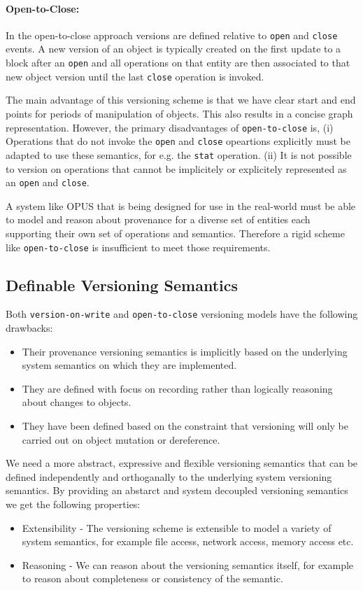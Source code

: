 \documentclass[withindex,glossary]{cam-thesis}
\begin{document}
\paragraph{Open-to-Close:}
In the open-to-close approach versions are defined relative to \texttt{open} and \texttt{close} events.
A new version of an object is typically created on the first update to a block after an \texttt{open} and all operations on that entity are then associated to that new object version until the last \texttt{close} operation is invoked.

The main advantage of this versioning scheme is that we have clear start and end points for periods of manipulation of objects.
This also results in a concise graph representation.
However, the primary disadvantages of \texttt{open-to-close} is,
(i) Operations that do not invoke the \texttt{open} and \texttt{close} opeartions explicitly must be adapted to use these semantics, for e.g. the \texttt{stat} operation.
(ii) It is not possible to version on operations that cannot be implicitely or explicitely represented as an \texttt{open} and \texttt{close}.

A system like OPUS that is being designed for use in the real-world must be able to model and reason about provenance for a diverse set of entities each supporting their own set of operations and semantics. Therefore a rigid scheme like \texttt{open-to-close} is insufficient to meet those requirements.

\subsection{Definable Versioning Semantics}
Both \texttt{version-on-write} and \texttt{open-to-close} versioning models have the following drawbacks:
\begin{itemize}
\item Their provenance versioning semantics is implicitly based on the underlying system semantics on which they are implemented.
\item They are defined with focus on recording rather than logically reasoning about changes to objects.
\item They have been defined based on the constraint that versioning will only be carried out on object mutation or dereference.
\end{itemize}

We need a more abstract, expressive and flexible versioning semantics that can be defined independently and orthoganally to the underlying system versioning semantics.
By providing an abstarct and system decoupled versioning semantics we get the following properties:
\begin{itemize}
\item Extensibility - The versioning scheme is extensible to model a variety of system semantics, for example file access, network access, memory access etc.
\item Reasoning - We can reason about the versioning semantics itself, for example to reason about completeness or consistency of the semantic.
\end{itemize}
\end{document}
